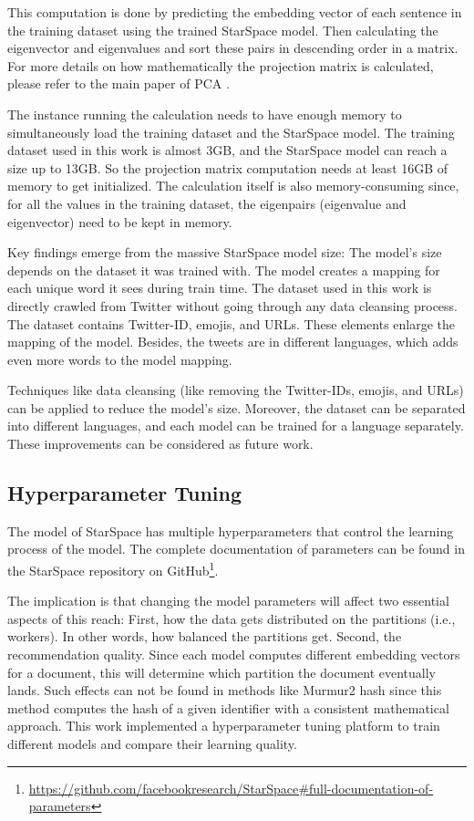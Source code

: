 This computation is done by predicting the embedding vector of each sentence in the training dataset using the trained StarSpace model. Then calculating the eigenvector and eigenvalues and sort these pairs in descending order in a matrix. For more details on how mathematically the projection matrix is calculated, please refer to the main paper of PCA \cite{woldPrincipalComponentAnalysis}.


The instance running the calculation needs to have enough memory to simultaneously load the training dataset and the StarSpace model. The training dataset used in this work is almost 3GB, and the StarSpace model can reach a size up to 13GB. So the projection matrix computation needs at least 16GB of memory to get initialized. The calculation itself is also memory-consuming since, for all the values in the training dataset, the eigenpairs (eigenvalue and eigenvector) need to be kept in memory.


Key findings emerge from the massive StarSpace model size: The model's size depends on the dataset it was trained with. The model creates a mapping for each unique word it sees during train time. The dataset used in this work is directly crawled from Twitter without going through any data cleansing process. The dataset contains Twitter-ID, emojis, and URLs. These elements enlarge the mapping of the model. Besides, the tweets are in different languages, which adds even more words to the model mapping.


Techniques like data cleansing (like removing the Twitter-IDs, emojis, and URLs) can be applied to reduce the model's size. Moreover, the dataset can be separated into different languages, and each model can be trained for a language separately. These improvements can be considered as future work.


\subsection{Hyperparameter Tuning}
\label{subsec:hyperparameter-tuning}
The model of StarSpace has multiple hyperparameters that control the learning process of the model. The complete documentation of parameters can be found in the StarSpace repository on GitHub\footnote{\url{https://github.com/facebookresearch/StarSpace\#full-documentation-of-parameters}}. 


The implication is that changing the model parameters will affect two essential aspects of this reach: First, how the data gets distributed on the partitions (i.e., workers). In other words, how balanced the partitions get. Second, the recommendation quality. Since each model computes different embedding vectors for a document, this will determine which partition the document eventually lands. Such effects can not be found in methods like Murmur2 hash since this method computes the hash of a given identifier with a consistent mathematical approach. This work implemented a hyperparameter tuning platform to train different models and compare their learning quality.


